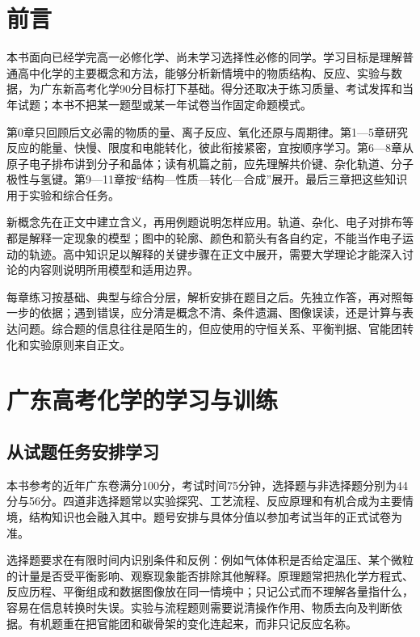 \maketitle

\chapter*{前言}

本书面向已经学完高一必修化学、尚未学习选择性必修的同学。学习目标是理解普通高中化学的主要概念和方法，能够分析新情境中的物质结构、反应、实验与数据，为广东新高考化学90分目标打下基础。得分还取决于练习质量、考试发挥和当年试题；本书不把某一题型或某一年试卷当作固定命题模式。

第0章只回顾后文必需的物质的量、离子反应、氧化还原与周期律。第1—5章研究反应的能量、快慢、限度和电能转化，彼此衔接紧密，宜按顺序学习。第6—8章从原子电子排布讲到分子和晶体；读有机篇之前，应先理解共价键、杂化轨道、分子极性与氢键。第9—11章按“结构—性质—转化—合成”展开。最后三章把这些知识用于实验和综合任务。

新概念先在正文中建立含义，再用例题说明怎样应用。轨道、杂化、电子对排布等都是解释一定现象的模型；图中的轮廓、颜色和箭头有各自约定，不能当作电子运动的轨迹。高中知识足以解释的关键步骤在正文中展开，需要大学理论才能深入讨论的内容则说明所用模型和适用边界。

每章练习按基础、典型与综合分层，解析安排在题目之后。先独立作答，再对照每一步的依据；遇到错误，应分清是概念不清、条件遗漏、图像误读，还是计算与表达问题。综合题的信息往往是陌生的，但应使用的守恒关系、平衡判据、官能团转化和实验原则来自正文。

\chapter*{广东高考化学的学习与训练}

\section*{从试题任务安排学习}
本书参考的近年广东卷满分100分，考试时间75分钟，选择题与非选择题分别为44分与56分。四道非选择题常以实验探究、工艺流程、反应原理和有机合成为主要情境，结构知识也会融入其中。题号安排与具体分值以参加考试当年的正式试卷为准。

选择题要求在有限时间内识别条件和反例：例如气体体积是否给定温压、某个微粒的计量是否受平衡影响、观察现象能否排除其他解释。原理题常把热化学方程式、反应历程、平衡组成和数据图像放在同一情境中；只记公式而不理解各量指什么，容易在信息转换时失误。实验与流程题则需要说清操作作用、物质去向及判断依据。有机题重在把官能团和碳骨架的变化连起来，而非只记反应名称。

